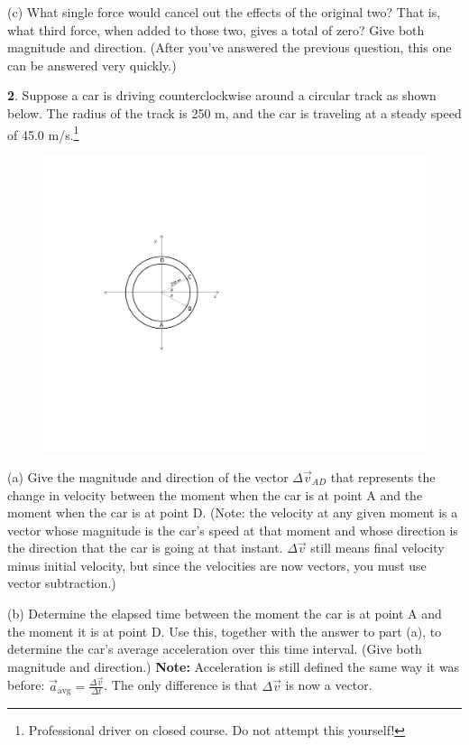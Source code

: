 \vfil\vfil

(c) What single force would cancel out the effects of the original two?  That
is, what third force, when added to those two, gives a total of zero?
Give both magnitude and direction.  (After you've answered the
previous question, this one can be answered very quickly.)

\vfil\eject


{\bf 2}.  Suppose a car is driving counterclockwise around a circular track as shown
below.  The radius of the track is 250 m, and the car is traveling
at a steady speed of 45.0 m/s.\footnote{Professional driver on closed
course.  Do not attempt this yourself!}

\begin{figure}[h]
\centerline{\includegraphics{vectors/vectors_fig_new.pdf}}
\end{figure}

(a) Give the magnitude and direction of the vector $\Delta{\vec v}_{AD}$
that represents the change in velocity between the moment when the
car is at point A and the moment when the car is at point D.  (Note:
the velocity at any given moment is a vector whose magnitude is the
car's speed at that moment and whose direction is the direction that
the car is going at that instant.  $\Delta{\vec v}$ still means
final velocity minus initial velocity, but since the velocities are
now vectors, you must use vector subtraction.)

\vfil

(b) Determine the elapsed time between the moment the car is at point A
and the moment it is at point D.  Use this, together with the answer to part (a), to determine
the car's average acceleration over this time interval.  (Give both magnitude
and direction.)  {\bf Note:} Acceleration is still defined the same
way it was before: ${\vec a}_{\mathrm{avg}}=\frac{\Delta \vec v}{\Delta t}$.
The only difference is that $\Delta{\vec v}$ is now a vector.


